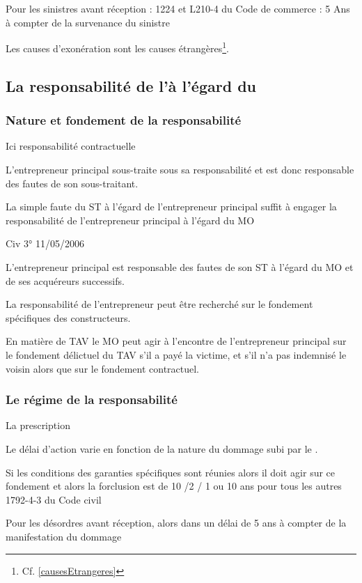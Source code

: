 			Pour les sinistres avant réception : 1224 et L210-4 du Code de commerce : 5 Ans à compter de la survenance du sinistre

			Les causes d’exonération sont les causes étrangères\footnote{Cf. \vref{causesEtrangeres}}.


	\subsection{La responsabilité de l'\ep à l'égard du \Mo}

		\subsubsection{Nature et fondement de la responsabilité}

			Ici responsabilité contractuelle

			L’entrepreneur principal sous-traite sous sa responsabilité et est donc responsable des fautes de son sous-traitant.

			La simple faute du ST à l’égard de l’entrepreneur principal suffit à engager la responsabilité de l’entrepreneur principal à l’égard du MO

			Civ 3° 11/05/2006

			L’entrepreneur principal est responsable des fautes de son ST à l’égard du MO et de ses acquéreurs successifs.

			La responsabilité de l’entrepreneur peut être recherché sur le fondement spécifiques des constructeurs.

			En matière de TAV le MO peut agir à l’encontre de l’entrepreneur principal sur le fondement délictuel du TAV s’il a payé la victime, et s’il n’a pas indemnisé le voisin alors que sur le fondement contractuel.



		\subsubsection{Le régime de la responsabilité}

			La prescription

			Le délai d’action varie en fonction de la nature du dommage subi par le \MO.


			Si les conditions des garanties spécifiques sont réunies alors il doit agir sur ce fondement et alors la forclusion est de 10 /2 / 1 ou 10 ans pour tous les autres 1792-4-3 du Code civil


			Pour les désordres avant réception, alors dans un délai de 5 ans à compter de la manifestation du dommage


